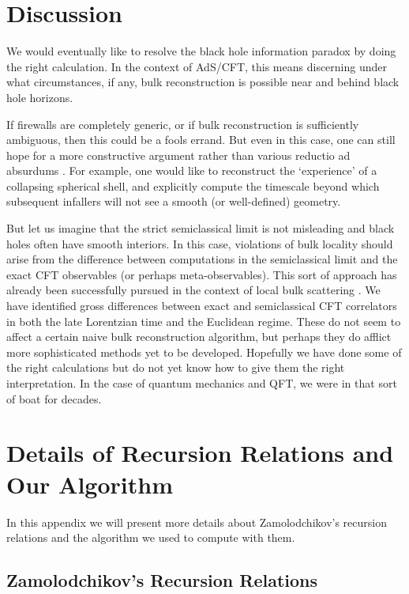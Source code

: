 \section{Discussion}

We would eventually like to resolve the black hole information paradox by doing the right calculation.  In the context of AdS/CFT, this means discerning under what circumstances, if any, bulk reconstruction is possible near and behind black hole horizons.  

If firewalls \cite{Almheiri:2012rt} are completely generic, or if bulk reconstruction is sufficiently ambiguous, then this could be a fools errand.    But even in this case, one can still hope for a more constructive argument rather than various reductio ad absurdums \cite{Almheiri:2013hfa}.  For example, one would like to reconstruct the `experience' of a collapsing spherical shell, and explicitly compute the timescale beyond which subsequent infallers will not see a smooth (or well-defined) geometry.

But let us imagine that the strict semiclassical limit is not misleading and black holes often have smooth interiors.  In this case, violations of bulk locality should arise from the difference between computations in the semiclassical limit and the exact CFT observables (or perhaps meta-observables).  This sort of approach has already been successfully pursued in the context of local bulk scattering \cite{Maldacena:2015iua}.  We have identified gross differences between exact and semiclassical CFT correlators in both the late Lorentzian time and the Euclidean regime.    These do not seem to affect a certain naive bulk reconstruction algorithm, but perhaps they do afflict more sophisticated methods yet to be developed.   Hopefully we have done some of the right calculations but do not yet know how to give them the right interpretation.  In the case of quantum mechanics and QFT, we were in that sort of boat for decades.

\appendix
\section{Details of Recursion Relations and Our Algorithm}
\label{app:ZRecursion}
In this appendix we will present more details about Zamolodchikov's recursion relations and the algorithm we used to compute with them.

\subsection{Zamolodchikov's Recursion Relations}

